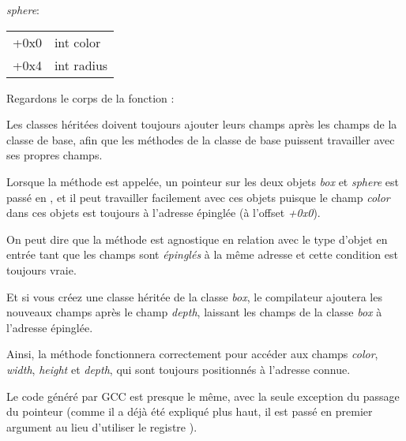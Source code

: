 \emph{sphere}:

\begin{center}
\begin{tabular}{ | l | l | }
\hline
  \tableheader{} \\
\hline
  +0x0 & int color \\
\hline
  +0x4 & int radius \\
\hline
\end{tabular}
\end{center}

Regardons le corps de la fonction \main:




Les classes héritées doivent toujours ajouter leurs champs après les champs de la
classe de base, afin que les méthodes de la classe de base puissent travailler avec
ses propres champs.


Lorsque la méthode  est appelée, un pointeur sur les deux
objets \emph{box} et \emph{sphere} est passé en , et il peut travailler facilement
avec ces objets puisque le champ \emph{color} dans ces objets est toujours à l'adresse
épinglée (à l'offset \emph{+0x0}).

On peut dire que la méthode  est agnostique en relation
avec le type d'objet en entrée tant que les champs sont \emph{épinglés} à la même adresse
et cette condition est toujours vraie.


Et si vous créez une classe héritée de la classe \emph{box}, le compilateur ajoutera
les nouveaux champs après le champ \emph{depth}, laissant les champs de la classe
\emph{box} à l'adresse épinglée.


Ainsi, la méthode  fonctionnera correctement pour accéder aux champs
\emph{color}, \emph{width}, \emph{height} et \emph{depth}, qui sont toujours positionnés
à l'adresse connue.

Le code généré par GCC est presque le même, avec la seule exception du passage du
pointeur  (comme il a déjà été expliqué plus haut, il est passé en premier
argument au lieu d'utiliser le registre \ECX).
